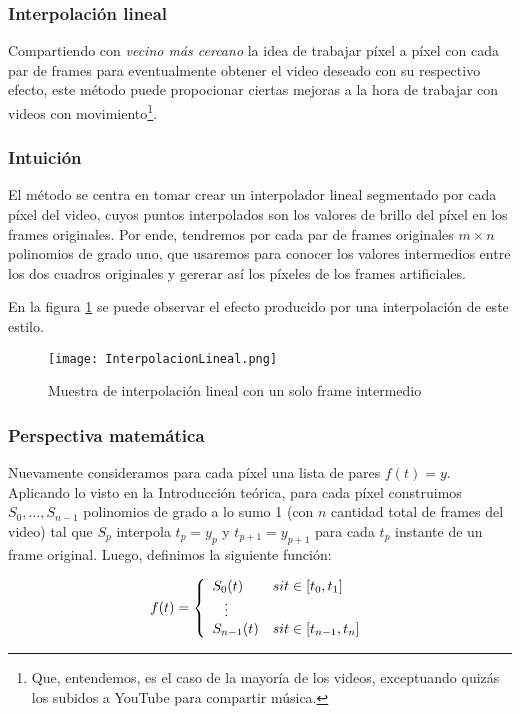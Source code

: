 \subsubsection{Interpolaci\'on lineal}

Compartiendo con \emph{vecino m\'as cercano} la idea de trabajar píxel a píxel con cada par de frames para eventualmente obtener el video deseado con su respectivo efecto, este método puede propocionar ciertas mejoras a la hora de trabajar con videos con movimiento\footnote{Que, entendemos, es el caso de la mayoría de los videos, exceptuando quizás los subidos a YouTube para compartir música.}.

\subsubsection*{\bf{Intuición}}
El m\'etodo se centra en tomar crear un interpolador lineal segmentado por cada píxel del video, cuyos puntos interpolados son los valores de brillo del píxel en los frames originales. Por ende, tendremos por cada par de frames originales $m \times n$ polinomios de grado uno, que usaremos para conocer los valores intermedios entre los dos cuadros originales y gererar así los píxeles de los frames artificiales.

En la figura \ref{fig:lineal} se puede observar el efecto producido por una interpolación de este estilo.

\begin{figure}[h!]
  \centering
    \texttt{[image: InterpolacionLineal.png]}
     \caption{Muestra de interpolaci\'on lineal con un solo frame intermedio}\label{fig:lineal}
\end{figure}
\noindent

\subsubsection*{\bf{Perspectiva matem\'atica}}
Nuevamente consideramos para cada píxel una lista de pares $f(t)=y$. Aplicando lo visto en la Introducción teórica, para cada píxel construimos $S_0, \ldots, S_{n - 1}$ polinomios de grado a lo sumo 1 (con $n$ cantidad total de frames del video) tal que $S_p$ interpola $t_p=y_p$ y $t_{p + 1}=y_{p+1}$ para cada $t_p$ instante de un frame original. Luego, definimos la siguiente funci\'on:
 
\[
f(t) = 
\left\{
    \begin{array}{ll}
        S_0(t)  & \mbox{si } t \in [t_{0}, t_1] \\
        \hspace{0.3cm}\vdots \\     
        S_{n - 1}(t) & \mbox{si } t \in [t_{n - 1}, t_n]
    \end{array}
\right.
\]

